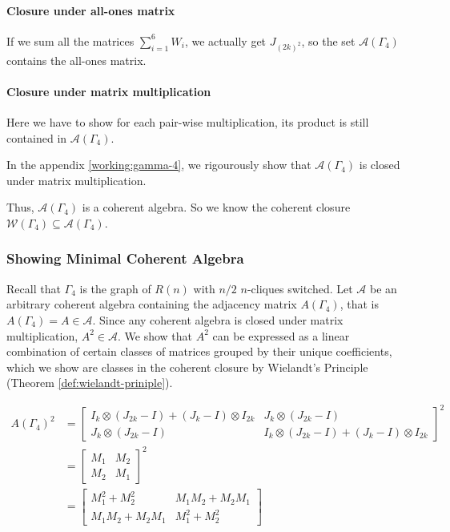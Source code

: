 \paragraph{Closure under all-ones matrix}
If we sum all the matrices $\sum_{i=1}^{6}W_i$, we actually get $J_{(2k)^2}$, so the set $\mathcal{A}(\Gamma_4)$ contains the all-ones matrix.

\paragraph{Closure under matrix multiplication}

Here we have to show for each pair-wise multiplication, its product is still contained in $\mathcal{A}(\Gamma_4)$. 

In the appendix \ref{working:gamma-4}, we rigourously show that $\mathcal{A}(\Gamma_4)$ is closed under matrix multiplication.

Thus, $\mathcal{A}(\Gamma_4)$ is a coherent algebra. So we know the coherent closure $\mathcal{W}(\Gamma_4) \subseteq \mathcal{A}(\Gamma_4)$.

\subsubsection{Showing Minimal Coherent Algebra}

Recall that $\Gamma_4$ is the graph of $R(n)$ with $n/2$ $n$-cliques switched. Let $\mathcal{A}$ be an arbitrary coherent algebra containing the adjacency matrix $A(\Gamma_4)$, that is $A(\Gamma_4)=A\in\mathcal{A}$. Since any coherent algebra is closed under matrix multiplication, $A^2\in\mathcal{A}$. We show that $A^2$ can be expressed as a linear combination of certain classes of matrices grouped by their unique coefficients, which we show are classes in the coherent closure by Wielandt's Principle (Theorem \ref{def:wielandt-priniple}).

\begin{align*}
    A(\Gamma_4)^2 
    &= \begin{bmatrix}
        I_k\otimes (J_{2k}-I) + (J_k-I)\otimes I_{2k} & J_k\otimes (J_{2k}-I) \\
        J_k\otimes (J_{2k}-I) & I_k\otimes (J_{2k}-I) + (J_k-I)\otimes I_{2k}
    \end{bmatrix}^2 \\
    &= \begin{bmatrix}
        M_1 & M_2 \\
        M_2 & M_1
    \end{bmatrix}^2 \\
    &= \begin{bmatrix}
        M_1^2+M_2^2 & M_1M_2 + M_2M_1 \\
        M_1M_2 + M_2M_1 & M_1^2+M_2^2
    \end{bmatrix}
\end{align*}

